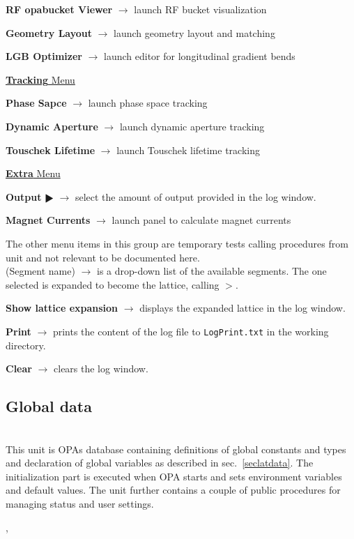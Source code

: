 \documentclass[12pt]{article}
\newcommand\code[1]{{\tt #1}}
\newcommand{\ofld}[1]{\colorbox{black!15}{{{\color{black}\bf #1}}}}
\newcommand{\ofldx}[1]{\colorbox{black!15}{{\color{black}(#1)}}}
\newcommand\guico[1]{{\color{blue}\code{#1}}}
\newcommand{\unico}[1]{{\color{burntorange}\code{#1}}}
\newcommand{\evcod}[2]{\ofld{#1} $\rightarrow$ \guico{#2}}
\newcommand{\evcodx}[2]{\ofldx{#1} $\rightarrow$ \guico{#2}}
\newcommand{\prcod}[2]{\opauni{#1}$>$\unico{#2}}
\newcommand{\opagui}[1]{\colorbox{blue!20}{{\color{black}\code{#1}}}}
\newcommand{\ogui}[1]{\hyperref[#1]{\opagui{#1}}}
\newcommand{\opauni}[1]{\colorbox{orange!30}{{\color{black}\code{#1}}}}
\newcommand{\ounih}[2]{\subsection{\label{#2}#1}{\Huge\opauni{#2}}\\}
\newcommand{\ouni}[1]{\hyperref[#1]{\opauni{#1}}}
\newcommand{\uses}[1]{\flushleft {\bf Uses:} #1}
\newcommand{\desc}[1]{#1}
\begin{document}
{\evcod{RF opabucket Viewer}{ds\_rfbu} launch RF bucket visualization \ogui{opabucket}

\evcod{Geometry Layout}{ds\_geo } launch geometry layout and matching \ogui{opageometry}

\evcod{LGB Optimizer}{ds\_lgbo } launch editor for longitudinal gradient bends \ogui{opalgbedit}


\underline{\ofld{Tracking} Menu}

\evcod{Phase Sapce}{tr\_phsp} launch phase space tracking \ogui{opatrackps}

\evcod{Dynamic Aperture}{tr\_dyna} launch dynamic aperture tracking \ogui{opatrackda}

\evcod{Touschek Lifetime}{tr\_ttau} launch Touschek lifetime tracking \ogui{opatracktt}

\underline{\ofld{Extra} Menu}

\evcod{Output $\RHD$}{tm\_di} select the amount of output provided in the log window. 

\evcod{Magnet Currents}{tm\_cur} launch panel to calculate magnet currents \ogui{opacurrents}

The other menu items in this group are temporary tests calling procedures from unit \ouni{testcode} and not relevant to be documented here.\\

\evcodx{Segment name}{ComboSeg} is a drop-down list of the available segments. The one selected is expanded to become the lattice, calling \prcod{editorlib}{MakeLattice}.

\evcod{Show lattice expansion}{butlatsh} displays the expanded lattice in the log window.

\evcod{Print}{ButLogPrt} prints the content of the log file to \code{LogPrint.txt} in the working directory.

\evcod{Clear}{ButLogClr} clears the log window.
}




\ounih{Global data}{globlib}

\desc{
This unit is OPAs database containing definitions of global constants and types and declaration of global variables as described in sec.~\ref{seclatdata}. 
The initialization part is executed when OPA starts and sets environment variables and default values. The unit further contains a couple of public procedures for managing status and user settings.
}

\uses{\opauni{mathlib}, \opauni{comauxlib}}
\end{document}
